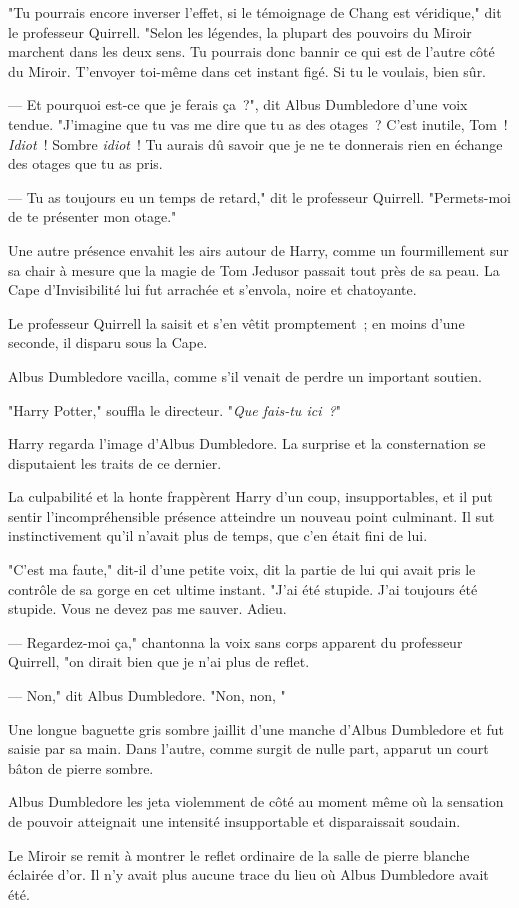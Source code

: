 "Tu pourrais encore inverser l'effet, si le témoignage de Chang est véridique," dit le professeur Quirrell. "Selon les légendes, la plupart des pouvoirs du Miroir marchent dans les deux sens. Tu pourrais donc bannir ce qui est de l'autre côté du Miroir. T'envoyer toi-même dans cet instant figé. Si tu le voulais, bien sûr.

--- Et pourquoi est-ce que je ferais ça~?", dit Albus Dumbledore d'une voix tendue. "J'imagine que tu vas me dire que tu as des otages~? C'est inutile, Tom~! \emph{Idiot}~! Sombre \emph{idiot}~! Tu aurais dû savoir que je ne te donnerais rien en échange des otages que tu as pris.

--- Tu as toujours eu un temps de retard," dit le professeur Quirrell. "Permets-moi de te présenter mon otage."

Une autre présence envahit les airs autour de Harry, comme un fourmillement sur sa chair à mesure que la magie de Tom Jedusor passait tout près de sa peau. La Cape d'Invisibilité lui fut arrachée et s'envola, noire et chatoyante.

Le professeur Quirrell la saisit et s'en vêtit promptement~; en moins d'une seconde, il disparu sous la Cape.

Albus Dumbledore vacilla, comme s'il venait de perdre un important soutien.

"Harry Potter," souffla le directeur. "\emph{Que fais-tu ici~?}"

Harry regarda l'image d'Albus Dumbledore. La surprise et la consternation se disputaient les traits de ce dernier.

La culpabilité et la honte frappèrent Harry d'un coup, insupportables, et il put sentir l'incompréhensible présence atteindre un nouveau point culminant. Il sut instinctivement qu'il n'avait plus de temps, que c'en était fini de lui.

"C'est ma faute," dit-il d'une petite voix, dit la partie de lui qui avait pris le contrôle de sa gorge en cet ultime instant. "J'ai été stupide. J'ai toujours été stupide. Vous ne devez pas me sauver. Adieu.

--- Regardez-moi ça," chantonna la voix sans corps apparent du professeur Quirrell, "on dirait bien que je n'ai plus de reflet.

--- Non," dit Albus Dumbledore. "Non, non, "

Une longue baguette gris sombre jaillit d'une manche d'Albus Dumbledore et fut saisie par sa main. Dans l'autre, comme surgit de nulle part, apparut un court bâton de pierre sombre.

Albus Dumbledore les jeta violemment de côté au moment même où la sensation de pouvoir atteignait une intensité insupportable et disparaissait soudain.

Le Miroir se remit à montrer le reflet ordinaire de la salle de pierre blanche éclairée d'or. Il n'y avait plus aucune trace du lieu où Albus Dumbledore avait été. 

